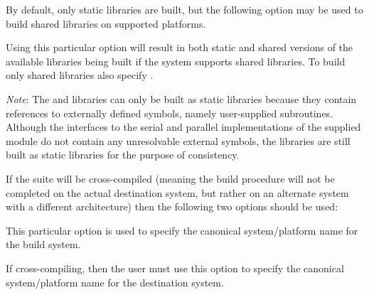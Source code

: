 
\vspace{0.25in}
\noindent By default, only static libraries are built, but the following option
may be used to build shared libraries on supported platforms.

\begin{config}

\item {}

  Using this particular option will result in both static and shared versions
  of the available {\sundials} libraries being built if the system supports
  shared libraries. To build only shared libraries also specify .

  {\em Note}: The {\fcvode} and {\fkinsol} libraries can only be built as static
  libraries because they contain references to externally defined symbols, namely
  user-supplied {\F} subroutines.  Although the {\F} interfaces to the serial and
  parallel implementations of the supplied {\nvector} module do not contain any
  unresolvable external symbols, the libraries are still built as static libraries
  for the purpose of consistency.

\end{config}


\vspace{0.25in}
\noindent If the {\sundials} suite will be cross-compiled (meaning the build
procedure will not be completed on the actual destination system, but rather
on an alternate system with a different architecture) then the following two
options should be used:

\begin{config}

\item {}

  This particular option is used to specify the canonical system/platform name
  for the build system.

\item {}

  If cross-compiling, then the user must use this option to specify the canonical
  system/platform name for the destination system.

\end{config}



